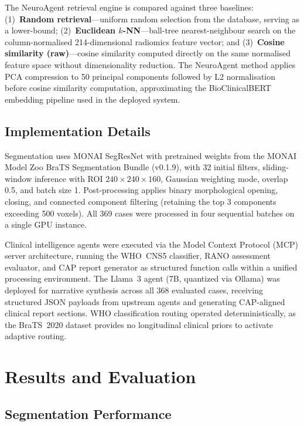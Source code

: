 \documentclass[journal]{IEEEtran}
\begin{document}
The NeuroAgent retrieval engine is compared against three baselines:
(1)~\textbf{Random retrieval}---uniform random selection from the
database, serving as a lower-bound; (2)~\textbf{Euclidean
$k$-NN}---ball-tree nearest-neighbour search on the column-normalised
214-dimensional radiomics feature vector; and (3)~\textbf{Cosine
similarity (raw)}---cosine similarity computed directly on the same
normalised feature space without dimensionality reduction. The NeuroAgent
method applies PCA compression to 50 principal components followed by
L2 normalisation before cosine similarity computation, approximating the
BioClinicalBERT embedding pipeline used in the deployed system.

\subsection{Implementation Details}

Segmentation uses MONAI SegResNet with pretrained weights from the MONAI
Model Zoo BraTS Segmentation Bundle (v0.1.9), with 32 initial filters,
sliding-window inference with ROI $240 \times 240 \times 160$, Gaussian
weighting mode, overlap 0.5, and batch size 1. Post-processing applies
binary morphological opening, closing, and connected component filtering
(retaining the top 3 components exceeding 500 voxels). All 369 cases were
processed in four sequential batches on a single GPU instance.

Clinical intelligence agents were executed via the Model Context Protocol
(MCP) server architecture, running the WHO~CNS5 classifier, RANO assessment
evaluator, and CAP report generator as structured function calls within a
unified processing environment. The Llama~3 agent (7B, quantized via
Ollama) was deployed for narrative synthesis across all 368 evaluated
cases, receiving structured JSON payloads from upstream agents and
generating CAP-aligned clinical report sections. WHO classification routing
operated deterministically, as the BraTS~2020 dataset provides no
longitudinal clinical priors to activate adaptive routing.

\section{Results and Evaluation}

\subsection{Segmentation Performance}
\end{document}

